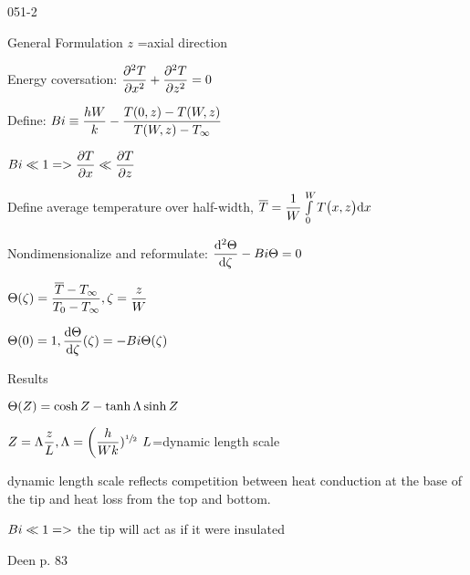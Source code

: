 \begin{mitframe}{051-2}
\begin{listone}
	\item General Formulation $z$ =axial direction
    
    		\begin{listtwo}
            		\item Energy coversation: $\dfrac{\partial^2\Temp}{\partial\disp^2}+\dfrac{\partial^2\Temp}{\partial{z}^2}=0$
                    \item Define: $\biot\equiv\dfrac{\heattranscoeff\work}{\thermcond}-\dfrac{\Temp(0,z)-\Temp(\work,z)}{\Temp(\work,z)-\Temp_{\infty}}$
     \item $\biot\ll 1=>\dfrac{\partial\Temp}{\partial\disp}\ll\dfrac{\partial\Temp}{\partial{z}}$   
     \item Define average temperature over half-width, $\overline\Temp=\dfrac{1}{\work}\int\limits_0^{\work}\Temp\big(\disp,z\big)\mathrm{d}\disp$
     \item Nondimensionalize and reformulate: $\dfrac{\mathrm{d}^2\dimltemp}{\mathrm{d}\zeta}-\biot\dimltemp=0$
     		\begin{listthree}
            			\item $\dimltemp(\zeta)=\dfrac{\overline{\Temp}-\Temp_{\infty}}{\Temp_{0}-\Temp_{\infty}}, \zeta=\dfrac{z}{\work}$
                        \item $\dimltemp(0)=1, \dfrac{\mathrm{d}\dimltemp}{\mathrm{d}\zeta}(\zeta)=-\biot\dimltemp(\zeta)$
                                              
                 \end{listthree}
            
            	\item Results
                \begin{listthree}
                		\item $\dimltemp(\compress)=\cosh\compress-\tanh\debroglie\sinh\compress$
                        \item $\compress=\debroglie\dfrac{z}{\length}, \debroglie=\bigg(\dfrac{\heattranscoeff}{\work\thermcond})^{\sfrac{1}{2}}$  $\length$=dynamic length scale
                        \item dynamic length scale reflects competition between heat conduction at the base of the tip and heat loss from the top and bottom.
                        \item $\biot\ll1=>$ the tip will act as if it were insulated
                        \item Deen p. 83
                \end{listthree}    
            \end{listtwo}
\end{listone}                
\end{mitframe}